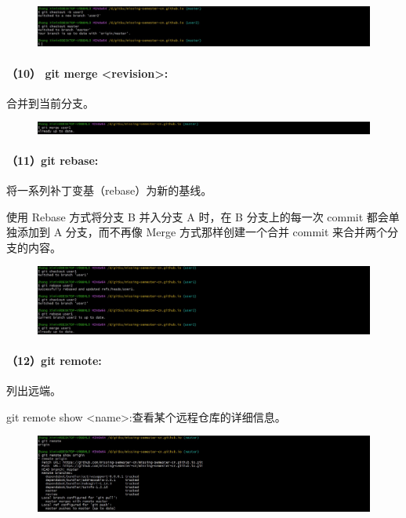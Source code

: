 \documentclass[a4paper, 12pt]{article}
\begin{document}
	\begin{figure}[H]
		\centering
		\includegraphics[width=1\textwidth]{024.jpg}
	\end{figure}
	
	\paragraph{（10）	git merge <revision>:}	
 	合并到当前分支。
	
	\begin{figure}[H]
		\centering
		\includegraphics[width=1\textwidth]{025.jpg}
	\end{figure}
	
	\paragraph{（11）git rebase:}	
	将一系列补丁变基（rebase）为新的基线。
	
	使用 Rebase 方式将分支 B 并入分支 A 时，在 B 分支上的每一次 commit 都会单独添加到 A 分支，而不再像 Merge 方式那样创建一个合并 commit 来合并两个分支的内容。
	
	\begin{figure}[H]
		\centering
		\includegraphics[width=1\textwidth]{027.jpg}
	\end{figure}
	
	\paragraph{（12）git remote:}	
	列出远端。
	
	git remote show <name>:查看某个远程仓库的详细信息。
	
	\begin{figure}[H]
		\centering
		\includegraphics[width=1\textwidth]{028.jpg}
	\end{figure}
	
\end{document}
